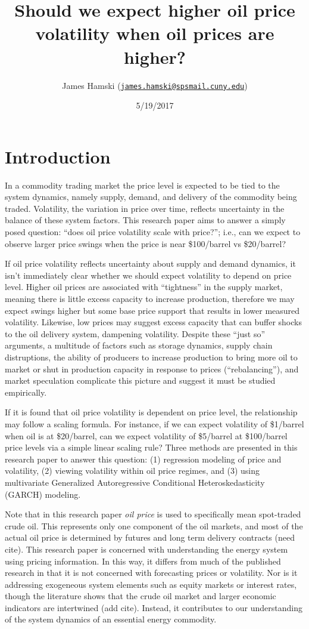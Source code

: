 \documentclass[11pt,]{article}
\title{Should we expect higher oil price volatility when oil prices are higher?}
\author{James Hamski
(\href{mailto:james.hamski@spsmail.cuny.edu}{\nolinkurl{james.hamski@spsmail.cuny.edu}})}
\date{5/19/2017}
\begin{document}
\maketitle

\section{Introduction}\label{introduction}

In a commodity trading market the price level is expected to be tied to
the system dynamics, namely supply, demand, and delivery of the
commodity being traded. Volatility, the variation in price over time,
reflects uncertainty in the balance of these system factors. This
research paper aims to answer a simply posed question: ``does oil price
volatility scale with price?''; i.e., can we expect to observe larger
price swings when the price is near \$100/barrel vs \$20/barrel?

If oil price volatility reflects uncertainty about supply and demand
dynamics, it isn't immediately clear whether we should expect volatility
to depend on price level. Higher oil prices are associated with
``tightness'' in the supply market, meaning there is little excess
capacity to increase production, therefore we may expect swings higher
but some base price support that results in lower measured volatility.
Likewise, low prices may suggest excess capacity that can buffer shocks
to the oil delivery system, dampening volatility. Despite these ``just
so'' arguments, a multitude of factors such as storage dynamics, supply
chain distruptions, the ability of producers to increase production to
bring more oil to market or shut in production capacity in response to
prices (``rebalancing''), and market speculation complicate this picture
and suggest it must be studied empirically.

If it is found that oil price volatility is dependent on price level,
the relationship may follow a scaling formula. For instance, if we can
expect volatility of \$1/barrel when oil is at \$20/barrel, can we
expect volatility of \$5/barrel at \$100/barrel price levels via a
simple linear scaling rule? Three methods are presented in this research
paper to answer this question: (1) regression modeling of price and
volatility, (2) viewing volatility within oil price regimes, and (3)
using multivariate Generalized Autoregressive Conditional
Heteroskedasticity (GARCH) modeling.

Note that in this research paper \emph{oil price} is used to
specifically mean spot-traded crude oil. This represents only one
component of the oil markets, and most of the actual oil price is
determined by futures and long term delivery contracts (need cite). This
research paper is concerned with understanding the energy system using
pricing information. In this way, it differs from much of the published
research in that it is not concerned with forecasting prices or
volatility. Nor is it addressing exogeneous system elements such as
equity markets or interest rates, though the literature shows that the
crude oil market and larger economic indicators are intertwined (add
cite). Instead, it contributes to our understanding of the system
dynamics of an essential energy commodity.
\end{document}
